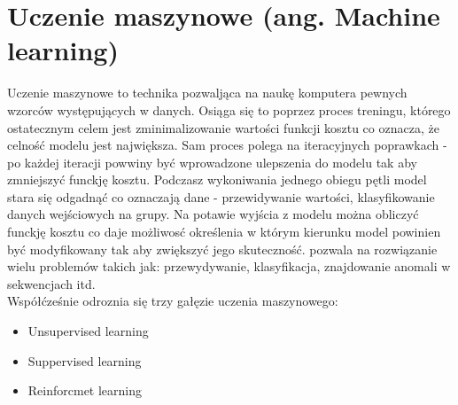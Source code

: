 \section{Uczenie maszynowe (ang. Machine learning)}
    Uczenie maszynowe to technika pozwaljąca na naukę komputera pewnych wzorców występujących w danych. 
    Osiąga się to poprzez proces treningu, którego ostatecznym celem jest zminimalizowanie wartości funkcji kosztu 
    co oznacza, że celność modelu jest największa. Sam proces polega na iteracyjnych poprawkach - po każdej iteracji 
    powwiny być wprowadzone ulepszenia do modelu tak aby zmniejszyć funckję kosztu. Podczasz wykoniwania jednego obiegu 
    pętli model stara się odgadnąć co oznaczają dane - przewidywanie wartości, klasyfikowanie danych wejściowych na grupy.
    Na potawie wyjścia z modelu można obliczyć funckję kosztu co daje możliwosć określenia w którym kierunku model 
    powinien być modyfikowany tak aby zwiększyć jego skuteczność.  
    pozwala na rozwiązanie wielu problemów takich jak: przewydywanie, klasyfikacja, znajdowanie anomali w sekwencjach itd. \\ 
    Współćześnie odroznia się trzy gałęzie uczenia maszynowego:
    \begin{itemize}
        \item Unsupervised learning
        \item Suppervised learning
        \item Reinforcmet learning
    \end{itemize} 
